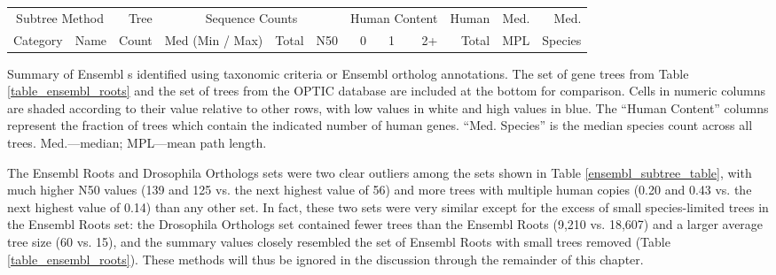 \bbtable
\centering \footnotesize
\begin{tabular}{llrb{2.5cm}rrrrrrrr}
\toprule

\multicolumn{2}{c}{Subtree Method} & Tree & \multicolumn{3}{c}{Sequence Counts} & \multicolumn{3}{c}{Human Content} & Human & Med. & Med. \\ 
\cmidrule(r){1-2} \cmidrule(r){4-6} \cmidrule(r){7-9}
Category & Name & Count  & \scriptsize{Med (Min / Max)} & Total & N50 & 0 & 1 & 2+ & Total & MPL & Species \\ 

  \midrule

\bottomrule
\end{tabular}
\caption{Summary of Ensembl \subtr{}s identified using taxonomic
  criteria or Ensembl ortholog annotations. The set of \cmp gene trees
  from Table \ref{table_ensembl_roots} and the set of trees from the
  OPTIC database \citep{Heger2008} are included at the bottom for
  comparison. Cells in numeric columns are shaded according to their
  value relative to other rows, with low values in white and high
  values in blue. The ``Human Content'' columns represent the fraction
  of trees which contain the indicated number of human
  genes. ``Med. Species'' is the median species count across all
  trees. Med.---median; MPL---mean path length.}
\label{ensembl_subtree_table}
\eetable


The Ensembl Roots and Drosophila Orthologs sets were two clear
outliers among the \subtr sets shown in Table
\ref{ensembl_subtree_table}, with much higher N50 values (139 and 125
vs. the next highest value of 56) and more trees with multiple human
copies (0.20 and 0.43 vs. the next highest value of 0.14) than any
other \subtr set. In fact, these two \subtr sets were very similar
except for the excess of small species-limited trees in the Ensembl
Roots set: the Drosophila Orthologs set contained fewer trees than the
Ensembl Roots (9,210 vs. 18,607) and a larger average tree size (60
vs. 15), and the summary values closely resembled the set of Ensembl
Roots with small trees removed (Table \ref{table_ensembl_roots}). These
methods will thus be ignored in the discussion through the remainder
of this chapter.

